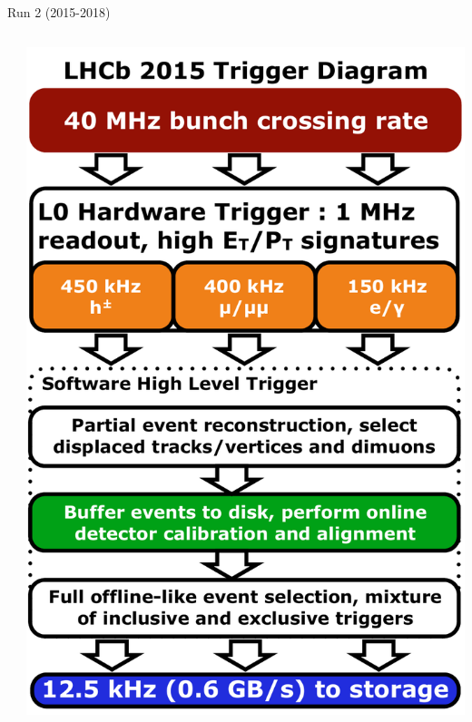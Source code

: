 \documentclass[aspectratio=1610]{beamer}
\begin{document}
\begin{frame}{\lhcb Run 2 (2015-2018)}
\begin{columns}
\begin{column}{0.7\textwidth}
\end{column}
\begin{column}{0.3\textwidth}
\includegraphics[width=\textwidth]{figs/detector/trigger-run2.pdf}
\end{column}
\end{columns}

\end{frame}
\end{document}
